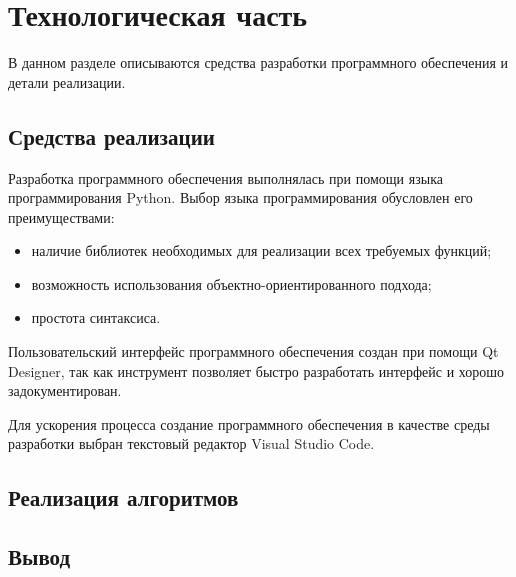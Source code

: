 \chapter{Технологическая часть}

В данном разделе описываются средства разработки программного обеспечения и детали реализации.

\section{Средства реализации}

Разработка программного обеспечения выполнялась при помощи языка программирования Python. Выбор языка программирования обусловлен его преимуществами:

\begin{itemize}
	\item наличие библиотек необходимых для реализации всех требуемых функций;
	\item возможность использования объектно-ориентированного подхода;
	\item простота синтаксиса.
\end{itemize}

Пользовательский интерфейс программного обеспечения создан при помощи Qt Designer, так как инструмент позволяет быстро разработать интерфейс и хорошо задокументирован.

Для ускорения процесса создание программного обеспечения в качестве среды разработки выбран текстовый редактор Visual Studio Code.

\section{Реализация алгоритмов}



\section*{Вывод}